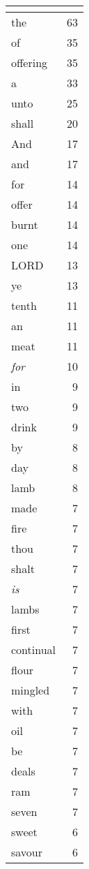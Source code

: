 \begin{center}
\begin{longtable}{l|r}
\hline \multicolumn{2}{c}{{ }} \\ \hline
\endfoot 
the & 63\\ \hline 
of & 35\\ \hline 
offering & 35\\ \hline 
a & 33\\ \hline 
unto & 25\\ \hline 
shall & 20\\ \hline 
And & 17\\ \hline 
and & 17\\ \hline 
for & 14\\ \hline 
offer & 14\\ \hline 
burnt & 14\\ \hline 
one & 14\\ \hline 
LORD & 13\\ \hline 
ye & 13\\ \hline 
tenth & 11\\ \hline 
an & 11\\ \hline 
meat & 11\\ \hline 
\emph{for} & 10\\ \hline 
in & 9\\ \hline 
two & 9\\ \hline 
drink & 9\\ \hline 
by & 8\\ \hline 
day & 8\\ \hline 
lamb & 8\\ \hline 
made & 7\\ \hline 
fire & 7\\ \hline 
thou & 7\\ \hline 
shalt & 7\\ \hline 
\emph{is} & 7\\ \hline 
lambs & 7\\ \hline 
first & 7\\ \hline 
continual & 7\\ \hline 
flour & 7\\ \hline 
mingled & 7\\ \hline 
with & 7\\ \hline 
oil & 7\\ \hline 
be & 7\\ \hline 
deals & 7\\ \hline 
ram & 7\\ \hline 
seven & 7\\ \hline 
sweet & 6\\ \hline 
savour & 6\\ \hline 

\end{longtable}
\end{center}
